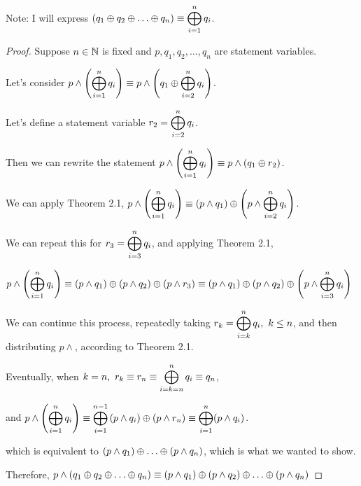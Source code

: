 \documentclass[a4paper,12pt]{report}
\begin{document}
Note: I will express $\displaystyle{\left(q_1 \oplus q_2 \oplus\ldots \oplus q_n \right)\equiv \bigoplus_{i=1}^n q_i}$.

\begin{proof}
	Suppose $n\in\mathbb{N}$ is fixed and $p,q_1,q_2,\dots,q_n$ are statement variables.
	\begin{list}{}{\setlength{\leftmargin}{1in}\setlength{\topsep}{0pt}}\item
		Let's consider $\displaystyle{p \land \left(\bigoplus_{i=1}^{n} q_i \right)\equiv p \land \left(q_1 \oplus\bigoplus_{i=2}^n q_i \right)}$.

		Let's define a statement variable $\displaystyle{r_2 = \bigoplus_{i=2}^n q_i}$.

		Then we can rewrite the statement $\displaystyle{p \land \left(\bigoplus_{i=1}^{n} q_i \right)\equiv p \land \left(q_1 \oplus r_2 \right)}$. 

		We can apply Theorem 2.1, $\displaystyle{p \land \left(\bigoplus_{i=1}^{n} q_i \right)\equiv (p\land q_1) \oplus\left(p\land\bigoplus_{i=2}^{n} q_i \right)}$.

		We can repeat this for $\displaystyle{r_3 = \bigoplus_{i=3}^{n} q_i}$, and applying Theorem 2.1,

		$\displaystyle{p\land\left(\bigoplus_{i=1}^n q_i \right)\equiv (p\land q_1) \oplus(p\land q_2) \oplus(p\land r_3) \equiv (p\land q_1) \oplus(p\land q_2) \oplus\left(p\land \bigoplus_{i=3}^{n} q_i \right)}$	

		We can continue this process, repeatedly taking $\displaystyle{r_k = \bigoplus_{i=k}^n q_i,\ k \leq n}$, and then distributing $p\land$, according to Theorem 2.1.

		Eventually, when $\displaystyle{k=n,\ r_k \equiv r_n \equiv \bigoplus_{i=k=n}^n q_i \equiv q_n}$, 
		
		and $\displaystyle{p \land \left(\bigoplus_{i=1}^{n} q_i \right)\equiv \bigoplus_{i=1}^{n-1} \left(p\land q_i \right)} \oplus (p \land r_n) \equiv \bigoplus_{i=1}^{n} (p\land q_i)$. 

		which is equivalent to $(p\land q_1)\lxor\dots\lxor(p\land q_n)$, which is what we wanted to show. \\
	\end{list}
	Therefore, $p \land (q_1 \oplus q_2 \oplus \ldots \oplus q_n) \equiv
	(p \land q_1) \oplus (p \land q_2) \oplus \ldots \oplus (p \land q_n)$
\end{proof}
\end{document}
